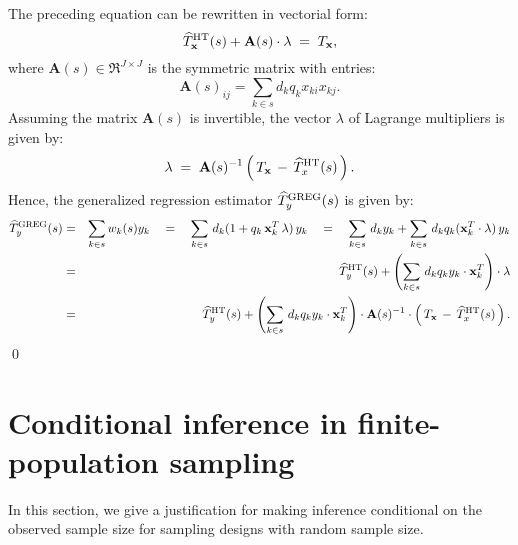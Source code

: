 \documentclass{article}
\begin{document}
The preceding equation can be rewritten in vectorial form:
\begin{equation*}
\widehat{T}^{\textnormal{HT}}_{\mathbf{x}}(s) + \mathbf{A}(s)\cdot\mathbf{\lambda} \; = \; T_{\mathbf{x}},
\end{equation*}
where $\mathbf{A}(s) \in \Re^{J \times J}$ is the symmetric matrix with entries:
\begin{equation*}
\mathbf{A}(s)_{ij} = \sum_{k \in s}d_{k}q_{k}x_{ki}x_{kj}.
\end{equation*}
{\color{red}Assuming the matrix $\mathbf{A}(s)$ is invertible}, the vector $\lambda$ of Lagrange multipliers
is given by:
\begin{equation*}
\mathbf{\lambda} \;=\; \mathbf{A}(s)^{-1}\left(\,T_{\mathbf{x}} \,-\, \widehat{T}^{\textnormal{HT}}_{x}(s)\,\right).
\end{equation*}
Hence, the generalized regression estimator $\widehat{T}^{\textnormal{GREG}}_{y}(s)$
is given by:
\begin{eqnarray*}
\widehat{T}^{\textnormal{GREG}}_{y}(s)
&=& \sum_{k \in s}w_{k}(s)y_{k}
\quad = \quad \sum_{k \in s}\,d_{k}(1 + q_{k}\,\mathbf{x}_{k}^{T}\,\mathbf{\lambda})\,y_{k}
\quad = \quad \sum_{k \in s}\,d_{k}y_{k} + \sum_{k \in s}\,d_{k}q_{k}(\mathbf{x}_{k}^{T}\cdot\mathbf{\lambda})\,y_{k}\\
&=& \widehat{T}^{\textnormal{HT}}_{y}(s) + \left(\sum_{k \in s}\,d_{k}q_{k}y_{k}\cdot\mathbf{x}_{k}^{T}\right)\cdot\mathbf{\lambda}\\
&=& \widehat{T}^{\textnormal{HT}}_{y}(s) + \left(\sum_{k \in s}\,d_{k}q_{k}y_{k}\cdot\mathbf{x}_{k}^{T}\right)\cdot\mathbf{A}(s)^{-1}\cdot\left(\,T_{\mathbf{x}} \,-\, \widehat{T}^{\textnormal{HT}}_{x}(s)\,\right).
\end{eqnarray*}
\qed


\section{Conditional inference in finite-population sampling}
\setcounter{theorem}{0}

In this section, we give a justification for making inference conditional on the observed sample size
for sampling designs with random sample size.
\end{document}
